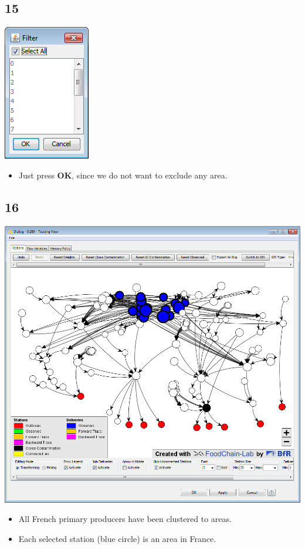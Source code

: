 \documentclass{beamer}
\begin{document}
\subsection{15}
\begin{frame}
	\begin{center}
  		\includegraphics[height=0.5\textheight]{15.png}
	\end{center}
	\begin{itemize}
		\item Just press \textbf{OK}, since we do not want to exclude any area.
	\end{itemize}
\end{frame}

\subsection{16}
\begin{frame}
	\begin{center}
  		\includegraphics[height=0.6\textheight]{16.png}
	\end{center}
	\begin{itemize}
		\item All French primary producers have been clustered to areas.
		\item Each selected station (blue circle) is an area in France.		
	\end{itemize}
\end{frame}
\end{document}
